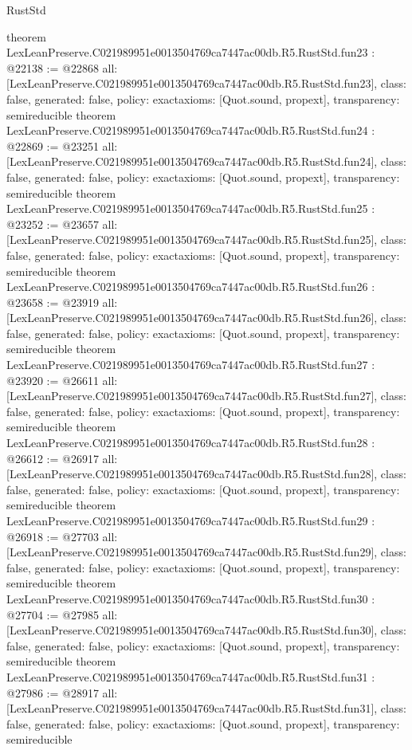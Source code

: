 \begin{lexlean}{RustStd}
\begin{coremodule}
{}
theorem LexLeanPreserve.C021989951e0013504769ca7447ac00db.R5.RustStd.fun23 : @22138 := @22868 {
  all: [LexLeanPreserve.C021989951e0013504769ca7447ac00db.R5.RustStd.fun23],
  class: false,
  generated: false,
  policy: exact{axioms: [Quot.sound, propext]},
  transparency: semireducible
}
theorem LexLeanPreserve.C021989951e0013504769ca7447ac00db.R5.RustStd.fun24 : @22869 := @23251 {
  all: [LexLeanPreserve.C021989951e0013504769ca7447ac00db.R5.RustStd.fun24],
  class: false,
  generated: false,
  policy: exact{axioms: [Quot.sound, propext]},
  transparency: semireducible
}
theorem LexLeanPreserve.C021989951e0013504769ca7447ac00db.R5.RustStd.fun25 : @23252 := @23657 {
  all: [LexLeanPreserve.C021989951e0013504769ca7447ac00db.R5.RustStd.fun25],
  class: false,
  generated: false,
  policy: exact{axioms: [Quot.sound, propext]},
  transparency: semireducible
}
theorem LexLeanPreserve.C021989951e0013504769ca7447ac00db.R5.RustStd.fun26 : @23658 := @23919 {
  all: [LexLeanPreserve.C021989951e0013504769ca7447ac00db.R5.RustStd.fun26],
  class: false,
  generated: false,
  policy: exact{axioms: [Quot.sound, propext]},
  transparency: semireducible
}
theorem LexLeanPreserve.C021989951e0013504769ca7447ac00db.R5.RustStd.fun27 : @23920 := @26611 {
  all: [LexLeanPreserve.C021989951e0013504769ca7447ac00db.R5.RustStd.fun27],
  class: false,
  generated: false,
  policy: exact{axioms: [Quot.sound, propext]},
  transparency: semireducible
}
theorem LexLeanPreserve.C021989951e0013504769ca7447ac00db.R5.RustStd.fun28 : @26612 := @26917 {
  all: [LexLeanPreserve.C021989951e0013504769ca7447ac00db.R5.RustStd.fun28],
  class: false,
  generated: false,
  policy: exact{axioms: [Quot.sound, propext]},
  transparency: semireducible
}
theorem LexLeanPreserve.C021989951e0013504769ca7447ac00db.R5.RustStd.fun29 : @26918 := @27703 {
  all: [LexLeanPreserve.C021989951e0013504769ca7447ac00db.R5.RustStd.fun29],
  class: false,
  generated: false,
  policy: exact{axioms: [Quot.sound, propext]},
  transparency: semireducible
}
theorem LexLeanPreserve.C021989951e0013504769ca7447ac00db.R5.RustStd.fun30 : @27704 := @27985 {
  all: [LexLeanPreserve.C021989951e0013504769ca7447ac00db.R5.RustStd.fun30],
  class: false,
  generated: false,
  policy: exact{axioms: [Quot.sound, propext]},
  transparency: semireducible
}
theorem LexLeanPreserve.C021989951e0013504769ca7447ac00db.R5.RustStd.fun31 : @27986 := @28917 {
  all: [LexLeanPreserve.C021989951e0013504769ca7447ac00db.R5.RustStd.fun31],
  class: false,
  generated: false,
  policy: exact{axioms: [Quot.sound, propext]},
  transparency: semireducible
}
\end{coremodule}
\end{lexlean}
